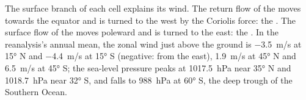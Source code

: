 The surface branch of each cell explains its wind. The return flow of the  moves towards the equator and is turned to the west by the Coriolis force: the
. The surface flow of the  moves poleward and is turned to the
east: the . In the reanalysis's annual mean, the zonal wind just above the
ground is \qty{-3.5}{m/s} at \ang{15} N and \qty{-4.4}{m/s} at \ang{15} S (negative:
from the east), \qty{+1.9}{m/s} at \ang{45} N and \qty{+6.5}{m/s} at \ang{45} S; the
sea-level pressure peaks at \qty{1017.5}{hPa} near \ang{35} N and \qty{1018.7}{hPa}
near \ang{32} S, and falls to \qty{988}{hPa} at \ang{60} S, the deep trough of
the Southern Ocean.

